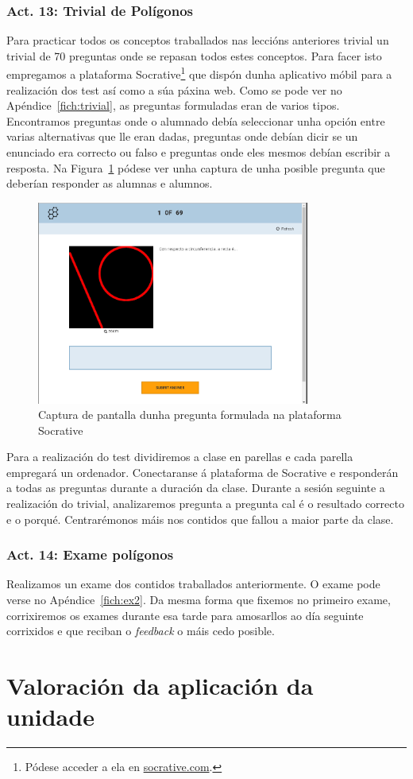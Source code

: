 \subsubsection{Act. 13: Trivial de Polígonos}\label{act13}
Para practicar todos os conceptos traballados nas leccións anteriores trivial un trivial de 70 preguntas onde se repasan todos estes conceptos. Para facer isto empregamos a plataforma Socrative\footnote{Pódese acceder a ela en \href{http://www.socrative.com/}{socrative.com}.} que dispón dunha aplicativo móbil para a realización dos test así como a súa páxina web. Como se pode ver no Apéndice~\ref{fich:trivial}, as preguntas formuladas eran de varios tipos. Encontramos preguntas onde o alumnado debía seleccionar unha opción entre varias alternativas que lle eran dadas, preguntas onde debían dicir se un enunciado era correcto ou falso e preguntas onde eles mesmos debían escribir a resposta. Na Figura~\ref{fig:act13} pódese ver unha captura de unha posible pregunta que deberían responder as alumnas e alumnos.

\begin{figure}[h!]
  \centering
  \includegraphics[width=0.8\textwidth]{img/socrative.png}
  \caption{Captura de pantalla dunha pregunta formulada na plataforma Socrative}\label{fig:act13}
\end{figure}

Para a realización do test dividiremos a clase en parellas e cada parella empregará un ordenador. Conectaranse á plataforma de Socrative e responderán a todas as preguntas durante a duración da clase. Durante a sesión seguinte a realización do trivial, analizaremos pregunta a pregunta cal é o resultado correcto e o porqué. Centrarémonos máis nos contidos que fallou a maior parte da clase.

\subsubsection{Act. 14: Exame polígonos}
Realizamos un exame dos contidos traballados anteriormente. O exame pode verse no Apéndice~\ref{fich:ex2}. Da mesma forma que fixemos no primeiro exame, corrixiremos os exames durante esa tarde para amosarllos ao día seguinte corrixidos e que reciban o \emph{feedback} o máis cedo posible.


\section{Valoración da aplicación da unidade}

